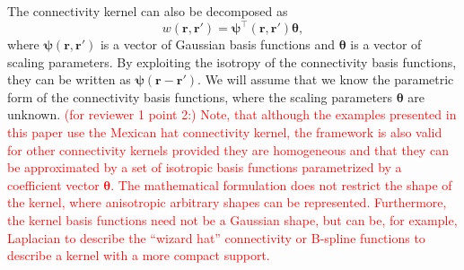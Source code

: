 \documentclass[review,authoryear,3p]{elsarticle}
\newcommand{\dean}[1]{\textcolor{red}{#1}}
\begin{document}
The connectivity kernel can also be decomposed as 
\begin{equation}\label{DefKernelDecomp}
	 w\left(\mathbf{r},\mathbf{r}'\right) =\boldsymbol{\psi}^\top\left(\mathbf{r},\mathbf{r}'\right) \boldsymbol{\theta},
\end{equation}
where $\boldsymbol{\psi}(\mathbf{r},\mathbf{r}')$ is a vector of Gaussian basis functions and $\boldsymbol{\theta}$ is a vector of scaling parameters. By exploiting the isotropy of the connectivity basis functions, they can be written as  
$\boldsymbol{\psi}(\mathbf{r}-\mathbf{r}')$. We will assume that we know the parametric form of the connectivity basis functions, where the scaling parameters $\boldsymbol{\theta}$ are unknown. 
\dean{(for reviewer 1 point 2:) Note, that although the examples presented in this paper use the Mexican hat connectivity kernel, the framework is also valid for other connectivity kernels provided they are homogeneous and that they can be approximated by a set of isotropic basis functions parametrized by a coefficient vector $\mathbf{\theta}$. The mathematical formulation does not restrict the shape of the kernel, where anisotropic arbitrary shapes can be represented. Furthermore, the kernel basis functions need not be a Gaussian shape, but can be, for example, Laplacian to describe the ``wizard hat'' connectivity or B-spline functions to describe a kernel with a more compact support.}
\end{document}
